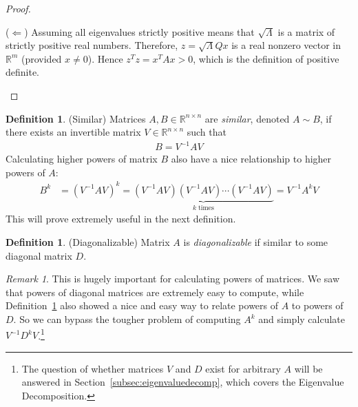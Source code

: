 \documentclass[12pt]{book}
\numberwithin{equation}{section} %
\theoremstyle{plain}
\theoremstyle{definition}
\newtheorem{defn}[thm]{Definition}
\theoremstyle{remark}
\newtheorem*{rmk}{Remark}
\newcommand{\Rm}{\mathbb{R}^m}
\newcommand{\Rnn}{\mathbb{R}^{n\times n}}
\begin{document}
\begin{proof}
\begin{enumerate}[label=(\roman*)]
    ($\Leftarrow$)
    Assuming all eigenvalues strictly positive means that
    $\sqrt{\Lambda}$ is a matrix of strictly positive real numbers.
    Therefore, $z=\sqrt{\Lambda}Qx$ is a real nonzero vector in $\Rm$
    (provided $x\neq 0$).
    Hence $z^Tz=x^TAx>0$, which is the definition of positive definite.
\end{enumerate}
\end{proof}

\begin{defn}{(Similar)}
\label{defn:similar}
Matrices $A,B \in \Rnn$ are \emph{similar}, denoted $A\sim B$, if there
exists an invertible matrix $V\in \Rnn$ such that
\begin{align*}
  B = V^{-1} A V
\end{align*}
Calculating higher powers of matrix $B$ also have a nice relationship to
higher powers of $A$:
\begin{align*}
  B^k &= \left(V^{-1} A V\right)^k
      = \underbrace{\left(V^{-1} A V\right)\left(V^{-1} A V\right)
      \cdots  \left(V^{-1} A V\right)}_{k \;\text{times}}
      = V^{-1} A^k V
\end{align*}
This will prove extremely useful in the next definition.
\end{defn}



\begin{defn}{(Diagonalizable)}
Matrix $A$ is \emph{diagonalizable} if similar to some diagonal matrix
$D$.
\end{defn}
\begin{rmk}
This is hugely important for calculating powers of matrices. We saw that
powers of diagonal matrices are extremely easy to compute, while
Definition~\ref{defn:similar} also showed a nice and easy way to relate
powers of $A$ to powers of $D$. So we can bypass the tougher problem of
computing $A^k$ and simply calculate $V^{-1} D^k V$.\footnote{%
The question of whether matrices $V$ and $D$ exist for arbitrary $A$
will be answered in Section~\ref{subsec:eigenvaluedecomp}, which covers
the Eigenvalue Decomposition.
}
\end{rmk}
\end{document}
